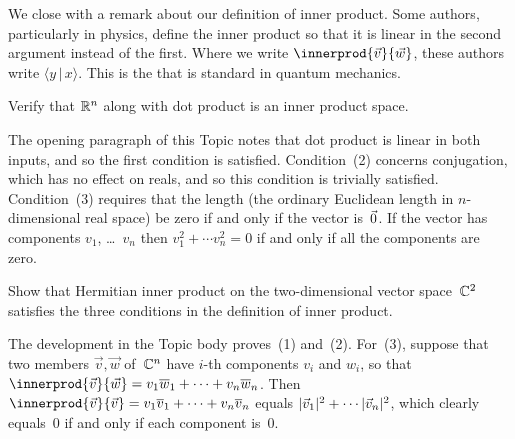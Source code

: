 We close with a remark about our definition of inner product.
Some authors, particularly in physics, define the inner product 
so that it is linear in the second argument instead of the first. 
Where we write $\innerprod{\vec{v}}{\vec{w}}$, 
these authors write $\langle y\, |\, x\rangle$. 
This is the
that is standard in quantum mechanics.

\begin{exercises}
\item 
Verify that $\mathbb{R}^n$ along with dot product is an inner product space.
\begin{answer}
The opening paragraph of this Topic notes that dot product is linear
in both inputs, and so the first condition is satisfied.
Condition~(2) concerns conjugation, 
which has no effect on reals, and 
so this condition is trivially satisfied. 
Condition~(3) requires that the length (the ordinary Euclidean length
in $n$-dimensional real space) be zero if and only if the vector is~$\vec{0}$.
If the vector has components $v_1$, \ldots~$v_n$ then
$v_1^2+\cdots v_n^2=0$ if and only if all the components are zero.
\end{answer}

\item
Show that Hermitian inner product on the two-dimensional vector space~$\mathbb{C}^2$ 
satisfies the three conditions in the definition of inner product. 
\begin{answer}
The development in the Topic body proves~(1) and~(2).
For~(3), suppose that 
two members  $\vec{v},\vec{w}$ of~$\mathbb{C}^n$
have $i$-th components $v_i$ and $w_i$, so that
$\innerprod{\vec{v}}{\vec{w}}=v_1\compconj{w}_1+\cdots+v_n\compconj{w}_n$.
Then $\innerprod{\vec{v}}{\vec{v}}=v_1\compconj{v}_1+\cdots+v_n\compconj{v}_n$
equals $\lvert\vec{v}_1\rvert^2+\cdots \lvert\vec{v}_n\rvert^2$, 
which clearly equals~$0$ if and only if each component is~$0$.
\end{answer}


\end{exercises}
